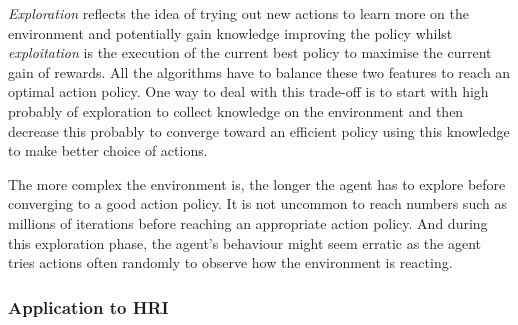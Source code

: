 	\textit{Exploration} reflects the idea of trying out new actions to learn more on the environment and potentially gain knowledge improving the policy whilst \textit{exploitation} is the execution of the current best policy to maximise the current gain of rewards. All the algorithms have to balance these two features to reach an optimal action policy. One way to deal with this trade-off is to start with high probably of exploration to collect knowledge on the environment and then decrease this probably to converge toward an efficient policy using this knowledge to make better choice of actions.
	
	The more complex the environment is, the longer the agent has to explore before converging to a good action policy. It is not uncommon to reach numbers such as millions of iterations before reaching an appropriate action policy. And during this exploration phase, the agent's behaviour might seem erratic as the agent tries actions often randomly to observe how the environment is reacting.
	
	
	\subsubsection{Application to HRI}
	
